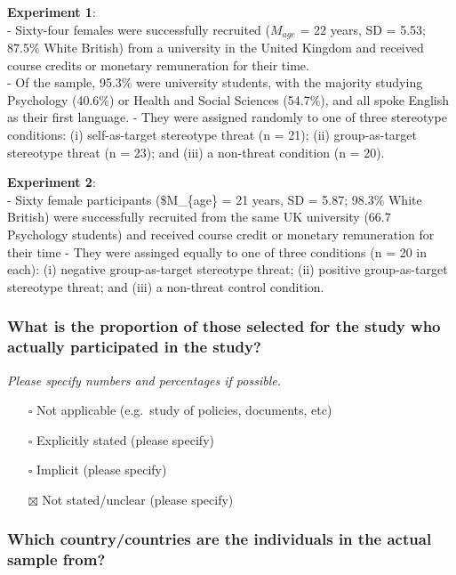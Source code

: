 \documentclass[
  doc, a4paper]{apa7}
\providecommand{\tightlist}{%
  \setlength{\itemsep}{0pt}\setlength{\parskip}{0pt}}
\begin{document}
\textbf{Experiment 1}:\\
- Sixty-four females were successfully recruited (\(M_{age}\) = 22 years, SD = 5.53; 87.5\% White British) from a university in the United Kingdom and received course credits or monetary remuneration for their time.\\
- Of the sample, 95.3\% were university students, with the majority studying Psychology (40.6\%) or Health and Social Sciences (54.7\%), and all spoke English as their first language.
- They were assigned randomly to one of three stereotype conditions: (i) self-as-target stereotype threat (n = 21); (ii) group-as-target stereotype threat (n = 23); and (iii) a non-threat condition (n = 20).

\textbf{Experiment 2}:\\
- Sixty female participants (\$M\_\{age\} = 21 years, SD = 5.87; 98.3\% White British) were successfully recruited from the same UK university (66.7 Psychology students) and received course credit or monetary remuneration for their time
- They were assinged equally to one of three conditions (n = 20 in each): (i) negative group-as-target stereotype threat; (ii) positive group-as-target stereotype threat; and (iii) a non-threat control condition.

\subsubsection{What is the proportion of those selected for the study who actually participated in the study?}\label{what-is-the-proportion-of-those-selected-for-the-study-who-actually-participated-in-the-study}

\emph{Please specify numbers and percentages if possible.}

\begin{itemize}
\tightlist
\item[$\square$]
  Not applicable (e.g.~study of policies, documents, etc)
\item[$\square$]
  Explicitly stated (please specify)
\item[$\square$]
  Implicit (please specify)
\item[$\boxtimes$]
  Not stated/unclear (please specify)
\end{itemize}

\subsubsection{Which country/countries are the individuals in the actual sample from?}\label{which-countrycountries-are-the-individuals-in-the-actual-sample-from}
\end{document}
